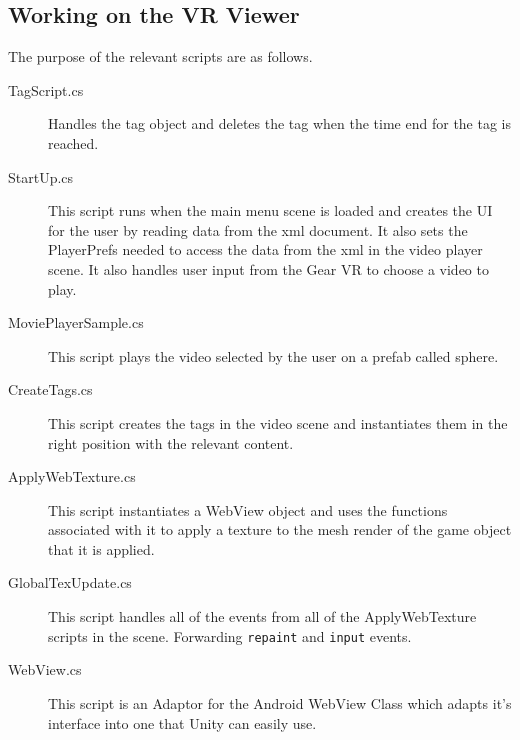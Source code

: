 \documentclass[12pt]{report}
\newcommand{\inlinecode}{\texttt}
\begin{document}
\begin{appendices}
    \section{Working on the VR Viewer}
    The purpose of the relevant scripts are as follows.
    \begin{description}
        \item[TagScript.cs] Handles the tag object and deletes the tag when
            the time end for the tag is reached.
        \item[StartUp.cs] This script runs when the main menu scene is loaded
            and creates the UI for the user by reading data from the xml
            document. It also sets the PlayerPrefs needed to access the data
            from the xml in the video player scene. It also handles user input
            from the Gear VR to choose a video to play.
        \item[MoviePlayerSample.cs] This script plays the video selected by
            the user on a prefab called sphere.
        \item[CreateTags.cs] This script creates the tags in the video scene
            and instantiates them in the right position with the relevant
            content.
        \item[ApplyWebTexture.cs] This script instantiates a WebView object and
            uses the functions associated with it to apply a texture to the
            mesh render of the game object that it is applied.
        \item[GlobalTexUpdate.cs] This script handles all of the events from
            all of the ApplyWebTexture scripts in the scene. Forwarding
            \inlinecode{repaint} and \inlinecode{input} events.
        \item[WebView.cs] This script is an Adaptor for the Android WebView
            Class which adapts it's interface into one that Unity can easily
            use.
    \end{description}

\end{appendices}
\end{document}
